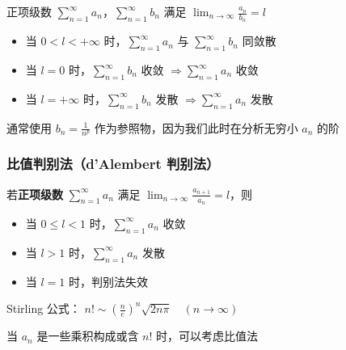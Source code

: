 \documentclass[lang = zh , final , oneside , openany , titlepage , zihao = -4 , linespread = 1.3 , baselineskip = false , cjk-font = windows , text-font = newtx , math-font = newtx]{sjtureport}
\begin{document}
\begin{theorem}
    正项级数
\(\displaystyle \sum_{n=1}^\infty a_n\)，\(\displaystyle \sum_{n=1}^\infty b_n\)
满足 \(\displaystyle \lim_{n\to\infty} \frac{a_n}{b_n} = l\)

\begin{itemize}
\item
  当 \(0 <l<+\infty\) 时，\(\displaystyle \sum_{n=1}^\infty a_n\) 与
  \(\displaystyle \sum_{n=1}^\infty b_n\) 同敛散
\item
  当 \(l=0\) 时，\(\displaystyle \sum_{n=1}^\infty b_n\) 收敛
  \(\Rightarrow \displaystyle \sum_{n=1}^\infty a_n\) 收敛
\item
  当 \(l=+\infty\) 时，\(\displaystyle \sum_{n=1}^\infty b_n\) 发散
  \(\Rightarrow \displaystyle \sum_{n=1}^\infty a_n\) 发散
\end{itemize}
\end{theorem}

\begin{remark}
    通常使用 \(b_n = \frac{1}{n^p}\) 作为参照物，因为我们此时在分析无穷小
\(a_n\) 的阶
\end{remark}

\subsubsection{比值判别法（d'Alembert 判别法）}

\begin{theorem}
    若\textbf{正项级数} \(\displaystyle \sum_{n=1}^\infty a_n\) 满足
\(\displaystyle \lim_{n\to\infty} \frac{a_{n+1}}{a_n} = l\)，则

\begin{itemize}
\item
  当 \(0\leq l<1\) 时，\(\displaystyle \sum_{n=1}^\infty a_n\) 收敛
\item
  当 \(l>1\) 时，\(\displaystyle \sum_{n=1}^\infty a_n\) 发散
\item
  当 \(l=1\) 时，判别法失效
\end{itemize}
\end{theorem}

\begin{remark}
    Stirling 公式：
\(n! \sim \left(\frac{n}{e}\right)^n \sqrt{2n\pi} \quad (n\to\infty)\)
\end{remark}

\begin{remark}
    当 \(a_n\) 是一些乘积构成或含 \(n!\) 时，可以考虑比值法
\end{remark}
\end{document}
